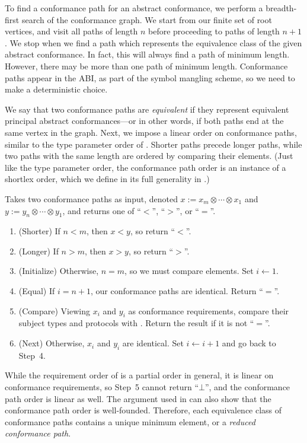 \documentclass[../generics]{subfiles}
\begin{document}
To find a conformance path for an abstract conformance, we perform a breadth-first search of the conformance graph. We start from our finite set of root vertices, and visit all paths of length $n$ before proceeding to paths of length $n+1$. We stop when we find a path which represents the equivalence class of the given abstract conformance. In fact, this will always find a path of minimum length. However, there may be more than one path of minimum length. Conformance paths appear in the ABI, as part of the symbol mangling scheme, so we need to make a deterministic choice.

We say that two conformance paths are \emph{equivalent} if they represent equivalent principal abstract conformances---or in other words, if both paths end at the same vertex in the graph. Next, we impose a linear order on conformance paths, similar to the type parameter order of . Shorter paths precede longer paths, while two paths with the same length are ordered by comparing their elements. (Just like the type parameter order, the conformance path order is an instance of a shortlex order, which we define in its full generality in .)

\begin{algorithm}\label{conformance path order alg}
Takes two conformance paths as input, denoted $x:=x_m \otimes \cdots \otimes x_1$ and $y:=y_n \otimes \cdots \otimes y_1$, and returns one of ``$<$'', ``$>$'', or ``$=$''.
\begin{enumerate}
\item (Shorter) If $n<m$, then $x<y$, so return ``$<$''.
\item (Longer) If $n>m$, then $x>y$, so return ``$>$''.
\item (Initialize) Otherwise, $n=m$, so we must compare elements. Set $i \leftarrow 1$.
\item (Equal) If $i=n+1$, our conformance paths are identical. Return ``$=$''.
\item (Compare) Viewing $x_i$ and $y_i$ as conformance requirements, compare their subject types and protocols with . Return the result if it is not ``$=$''.
\item (Next) Otherwise, $x_i$ and $y_i$ are identical. Set $i\leftarrow i+1$ and go back to Step~4.
\end{enumerate}
\end{algorithm}
While the requirement order of  is a partial order in general, it is linear on conformance requirements, so Step~5 cannot return ``$\bot$'', and the conformance path order is linear as well. The argument used in  can also show that the conformance path order is well-founded. Therefore, each equivalence class of conformance paths contains a unique minimum element, or a \emph{reduced conformance path}.
\end{document}
